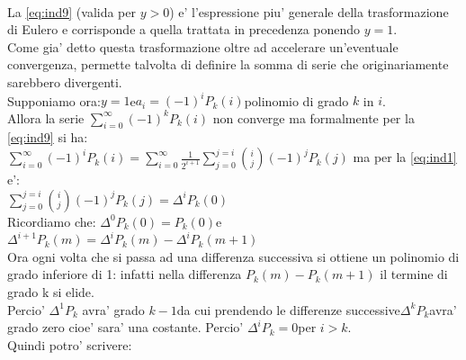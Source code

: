 \documentclass[12pt,a4paper]{article}
\begin{document}
\begin{flushleft}
\begin{equation}
\end{equation}
\\
\vspace{5mm}
La \eqref{eq:ind9} (valida per $y>0$) e' l'espressione piu' generale della trasformazione di Eulero e corrisponde a quella trattata in precedenza ponendo $y=1$.\\
Come gia' detto questa trasformazione oltre ad accelerare un'eventuale convergenza, permette talvolta di definire la somma di serie che originariamente sarebbero divergenti.\\
\vspace{10mm}
Supponiamo ora:\hspace{5mm}$y=1$\hspace{5mm}e\hspace{5mm}$a_{i}=(-1)^{i}P_{k}(i)$\hspace{5mm}polinomio di grado $k$ in $i$.\\
\vspace{5mm}
Allora la serie $\sum_{i=0}^{\infty}{(-1)^{k}P_{k}(i)}$ non converge ma formalmente per la \eqref{eq:ind9} si ha:\\
\vspace{5mm}
$\sum_{i=0}^{\infty}{(-1)^{i}P_{k}(i)}=\sum_{i=0}^{\infty}{\frac{1}{2^{i+1}}\sum_{j=0}^{j=i}{\binom{i}{j}(-1)^{j}P_{k}(j)}}$ ma per la \eqref{eq:ind1} e':\\
\vspace{5mm}
$\sum_{j=0}^{j=i}{\binom{i}{j}(-1)^{j}P_{k}(j)}=\Delta^{i}P_{k}(0)$\\
\vspace{5mm}
Ricordiamo che: $\Delta^{0}P_{k}(0)=P_{k}(0)$\hspace{5mm}e\hspace{5mm}$\Delta^{i+1}P_{k}(m)=\Delta^{i}P_{k}(m)-\Delta^{i}P_{k}(m+1)$\\
\vspace{5mm}
Ora ogni volta che si passa ad una differenza successiva si ottiene un polinomio di grado inferiore di 1: infatti nella differenza $P_k(m)-P_k(m+1)$ il termine di grado k si elide.\\
Percio' $\Delta^{1}P_{k}$ avra' grado $k-1$\hspace{5mm}da cui prendendo le differenze successive\hspace{5mm}$\Delta^{k}P_{k}$\hspace{5mm}avra' grado zero cioe' sara' una costante. Percio' $\Delta^{i}P_{k}=0$\hspace{5mm}per $i>k$.\\
Quindi potro' scrivere:\\

\end{flushleft}
\end{document}
